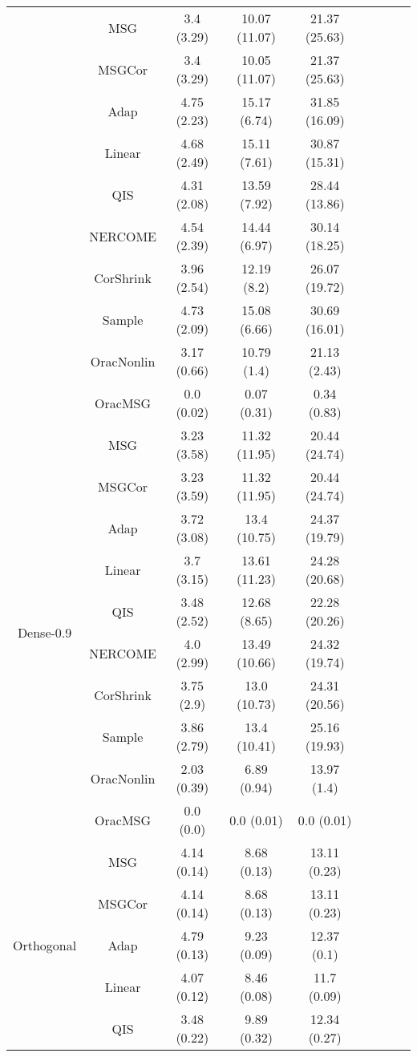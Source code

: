 \documentclass{article}
\begin{document}
\begin{table}[H]
{\begin{tabular}{ccccccccc}
 & MSG & 3.4 (3.29)  & 10.07 (11.07) & 21.37 (25.63) \\
 & MSGCor   & 3.4 (3.29)  & 10.05 (11.07) & 21.37 (25.63) \\
 & Adap     & 4.75 (2.23) & 15.17 (6.74)  & 31.85 (16.09) \\
 & Linear         & 4.68 (2.49) & 15.11 (7.61)  & 30.87 (15.31) \\
 & QIS            & 4.31 (2.08) & 13.59 (7.92)  & 28.44 (13.86) \\
 & NERCOME        & 4.54 (2.39) & 14.44 (6.97)  & 30.14 (18.25) \\
 & CorShrink      & 3.96 (2.54) & 12.19 (8.2)   & 26.07 (19.72) \\
 & Sample            & 4.73 (2.09) & 15.08 (6.66)  & 30.69 (16.01) \\
 & OracNonlin & 3.17 (0.66) & 10.79 (1.4)   & 21.13 (2.43)  \\
 & OracMSG  & 0.0 (0.02)  & 0.07 (0.31)   & 0.34 (0.83)   \\ \midrule
\multirow{10}{*}{Dense-0.9}  
 & MSG & 3.23 (3.58) & 11.32 (11.95) & 20.44 (24.74) \\
 & MSGCor   & 3.23 (3.59) & 11.32 (11.95) & 20.44 (24.74) \\
 & Adap     & 3.72 (3.08) & 13.4 (10.75)  & 24.37 (19.79) \\
 & Linear         & 3.7 (3.15)  & 13.61 (11.23) & 24.28 (20.68) \\
 & QIS            & 3.48 (2.52) & 12.68 (8.65) & 22.28 (20.26) \\
 & NERCOME        & 4.0 (2.99)  & 13.49 (10.66) & 24.32 (19.74) \\
 & CorShrink      & 3.75 (2.9)  & 13.0 (10.73)  & 24.31 (20.56) \\
 & Sample            & 3.86 (2.79) & 13.4 (10.41)  & 25.16 (19.93) \\
 & OracNonlin & 2.03 (0.39) & 6.89 (0.94)   & 13.97 (1.4)   \\
 & OracMSG  & 0.0 (0.0)   & 0.0 (0.01)    & 0.0 (0.01)   \\ \midrule
\multirow{10}{*}{Orthogonal}  
 & MSG & 4.14 (0.14) & 8.68 (0.13)  & 13.11 (0.23) \\
 & MSGCor   & 4.14 (0.14) & 8.68 (0.13)  & 13.11 (0.23) \\
 & Adap     & 4.79 (0.13) & 9.23 (0.09)  & 12.37 (0.1)  \\
 & Linear         & 4.07 (0.12) & 8.46 (0.08)  & 11.7 (0.09)  \\
 & QIS            & 3.48 (0.22) & 9.89 (0.32) & 12.34 (0.27) \\

\end{tabular}}
\end{table}
\end{document}
